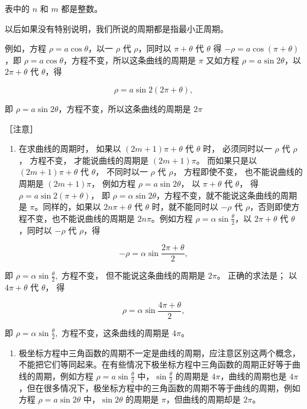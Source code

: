 表中的 \(n\) 和 \(m\) 都是整数。

以后如果没有特别说明，我们所说的周期都是指最小正周期。

例如，方程 \(\rho = a\cos \theta\)，以一 \(\rho\) 代 \(\rho\)，同时以
\(\pi +\theta\) 代 \(\theta\) 得 \(-\rho = a\cos (\pi +\theta)\)，即
\(\rho = a\cos \theta\)，方程不变，所以这条曲线的周期是 \(\pi\) 又如方程
\(\rho = a\sin 2\theta\)，以 \(2\pi +\theta\) 代 \(\theta\)，得

\[
\rho = a \sin 2 (2 \pi + \theta),
\]

即 \(\rho = a\sin 2\theta\)，方程不变，所以这条曲线的周期是 \(2\pi\)

［注意］

\begin{enumerate}
\def\labelenumi{\arabic{enumi}.}
\tightlist
\item
  在求曲线的周期时， 如果以 \((2m + 1)\pi + \theta\) 代 \(\theta\) 时，
  必须同时以一 \(\rho\) 代 \(\rho\)， 方程不变， 才能说曲线的周期是
  \((2m + 1)\pi\)。 而如果只是以 \((2m + 1)\pi + \theta\) 代
  \(\theta\)， 不同时以一 \(\rho\) 代 \(\rho\)， 方程即使不变，
  也不能说曲线的周期是 \((2m + 1)\pi\)， 例如方程
  \(\rho = a\sin 2\theta\)， 以 \(\pi + \theta\) 代 \(\theta\)， 得
  \(\rho = a\sin 2(\pi + \theta)\)， 即
  \(\rho = \alpha \sin 2\theta\)，方程不变，就不能说这条曲线的周期是
  \(\pi\)。同样的，如果以 \(2n\pi + \theta\) 代 \(\theta\)
  时，就不能同时以 \(-\rho\) 代
  \(\rho\)，否则即使方程不变，也不能说曲线的周期是 \(2n\pi\)。例如方程
  \(\rho = \alpha \sin \frac{\theta}{2}\)，以 \(2\pi + \theta\) 代
  \(\theta\)，同时以 \(-\rho\) 代 \(\rho\)，得
\end{enumerate}

\[
- \rho = \alpha \sin \frac {2 \pi + \theta}{2},
\]

即 \(\rho = \alpha \sin \frac{\theta}{2},\) 方程不变，
但不能说这条曲线的周期是 \(2\pi\)。 正确的求法是； 以 \(4\pi + \theta\)
代 \(\theta\)， 得

\[
\rho = \alpha \sin \frac {4 \pi + \theta}{2},
\]

即 \(\rho = \alpha \sin \frac{\theta}{2},\) 方程不变，这条曲线的周期是
\(4\pi\)。

\begin{enumerate}
\def\labelenumi{\arabic{enumi}.}
\setcounter{enumi}{1}
\tightlist
\item
  极坐标方程中三角函数的周期不一定是曲线的周期，应注意区别这两个概念，不能把它们等同起来。在有些情况下极坐标方程中三角函数的周期正好等于曲线的周期，例如方程
  \(\rho = a\sin \frac{\theta}{2}\) 中，\(\sin \frac{\theta}{2}\)
  的周期是 \(4\pi\)，曲线的周期也是
  \(4\pi\)，但在很多情况下，极坐标方程中的三角函数的周期不等于曲线的周期，例如方程
  \(\rho = a\sin 2\theta\) 中，\(\sin 2\theta\) 的周期是
  \(\pi\)，但曲线的周期却是 \(2\pi\)。
\end{enumerate}

